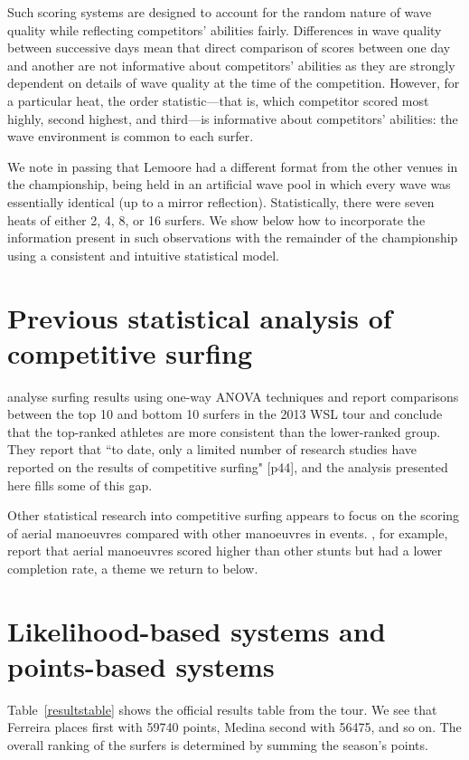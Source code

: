 \documentclass{article}
\begin{document}
Such scoring systems are designed to account for the random nature of
wave quality while reflecting competitors' abilities fairly.
Differences in wave quality between successive days mean that direct
comparison of scores between one day and another are not informative
about competitors' abilities as they are strongly dependent on details
of wave quality at the time of the competition.  However, for a
particular heat, the order statistic---that is, which competitor
scored most highly, second highest, and third---is informative about
competitors' abilities: the wave environment is common to each surfer.

We note in passing that Lemoore had a different format from the other
venues in the championship, being held in an artificial wave pool in
which every wave was essentially identical (up to a mirror
reflection).  Statistically, there were seven heats of either 2, 4, 8,
or 16 surfers.  We show below how to incorporate the information
present in such observations with the remainder of the championship
using a consistent and intuitive statistical model.

\section{Previous statistical analysis of competitive surfing}

\citet{farley2013} analyse surfing results using
one-way ANOVA techniques and report comparisons between the top 10 and
bottom 10 surfers in the 2013 WSL tour and conclude
that the top-ranked athletes are more consistent than the lower-ranked
group.  They report that ``to date, only a limited number of research
studies have reported on the results of competitive surfing" [p44],
and the analysis presented here fills some of this gap.

Other statistical research into competitive surfing appears to focus
on the scoring of aerial manoeuvres compared with other manoeuvres in
events.  \citet{lundgren2014}, for example,
report that aerial manoeuvres scored higher than other stunts but had
a lower completion rate, a theme we return to below.

\section{Likelihood-based systems and points-based systems}

Table~\ref{resultstable} shows the official results table from the
tour.  We see that Ferreira places first with 59740 points, Medina
second with 56475, and so on.  The overall ranking of the surfers is
determined by summing the season's points.
\end{document}
